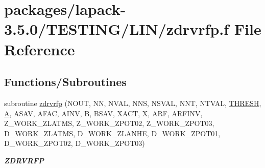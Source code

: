 \hypertarget{zdrvrfp_8f}{}\section{packages/lapack-\/3.5.0/\+T\+E\+S\+T\+I\+N\+G/\+L\+I\+N/zdrvrfp.f File Reference}
\label{zdrvrfp_8f}
\subsection*{Functions/\+Subroutines}
\begin{DoxyCompactItemize}
\item 
subroutine \hyperlink{group__complex16__lin_ga56e04460a51baee5bf4cd2ae7588bc2c}{zdrvrfp} (N\+O\+U\+T, N\+N, N\+V\+A\+L, N\+N\+S, N\+S\+V\+A\+L, N\+N\+T, N\+T\+V\+A\+L, \hyperlink{zlaqgs_8c_a0656018abfc9fa2821827415f5d5ea57}{T\+H\+R\+E\+S\+H}, \hyperlink{classA}{A}, A\+S\+A\+V, A\+F\+A\+C, A\+I\+N\+V, B, B\+S\+A\+V, X\+A\+C\+T, X, A\+R\+F, A\+R\+F\+I\+N\+V, Z\+\_\+\+W\+O\+R\+K\+\_\+\+Z\+L\+A\+T\+M\+S, Z\+\_\+\+W\+O\+R\+K\+\_\+\+Z\+P\+O\+T02, Z\+\_\+\+W\+O\+R\+K\+\_\+\+Z\+P\+O\+T03, D\+\_\+\+W\+O\+R\+K\+\_\+\+Z\+L\+A\+T\+M\+S, D\+\_\+\+W\+O\+R\+K\+\_\+\+Z\+L\+A\+N\+H\+E, D\+\_\+\+W\+O\+R\+K\+\_\+\+Z\+P\+O\+T01, D\+\_\+\+W\+O\+R\+K\+\_\+\+Z\+P\+O\+T02, D\+\_\+\+W\+O\+R\+K\+\_\+\+Z\+P\+O\+T03)
\begin{DoxyCompactList}\small\item\em {\bfseries Z\+D\+R\+V\+R\+F\+P} \end{DoxyCompactList}\end{DoxyCompactItemize}
